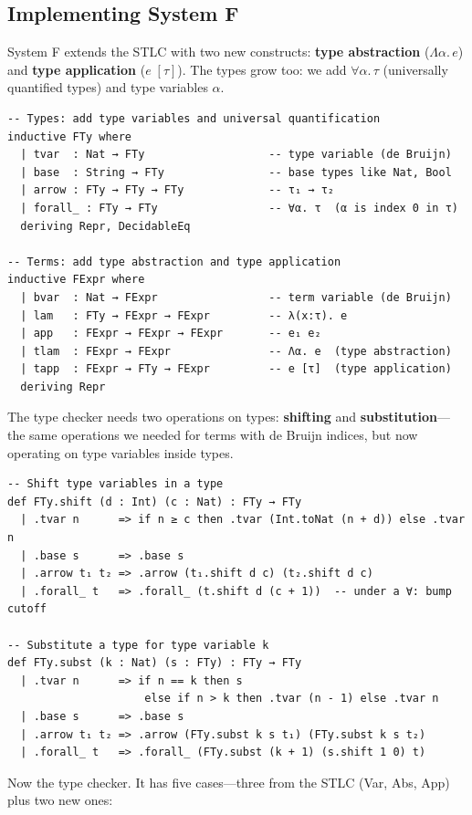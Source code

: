 \documentclass[11pt,a4paper]{article}
\theoremstyle{definition}
\newcommand{\Lam}{\Lambda}
\begin{document}
\subsection{Implementing System F}

System F extends the STLC with two new constructs: \textbf{type abstraction}
($\Lam\alpha.\, e$) and \textbf{type application} ($e\;[\tau]$). The types
grow too: we add $\forall\alpha.\, \tau$ (universally quantified types) and
type variables $\alpha$.

\begin{verbatim}
-- Types: add type variables and universal quantification
inductive FTy where
  | tvar  : Nat → FTy                   -- type variable (de Bruijn)
  | base  : String → FTy                -- base types like Nat, Bool
  | arrow : FTy → FTy → FTy             -- τ₁ → τ₂
  | forall_ : FTy → FTy                 -- ∀α. τ  (α is index 0 in τ)
  deriving Repr, DecidableEq

-- Terms: add type abstraction and type application
inductive FExpr where
  | bvar  : Nat → FExpr                 -- term variable (de Bruijn)
  | lam   : FTy → FExpr → FExpr         -- λ(x:τ). e
  | app   : FExpr → FExpr → FExpr       -- e₁ e₂
  | tlam  : FExpr → FExpr               -- Λα. e  (type abstraction)
  | tapp  : FExpr → FTy → FExpr         -- e [τ]  (type application)
  deriving Repr
\end{verbatim}

The type checker needs two operations on types: \textbf{shifting} and
\textbf{substitution}---the same operations we needed for terms with de Bruijn
indices, but now operating on type variables inside types.

\begin{verbatim}
-- Shift type variables in a type
def FTy.shift (d : Int) (c : Nat) : FTy → FTy
  | .tvar n      => if n ≥ c then .tvar (Int.toNat (n + d)) else .tvar n
  | .base s      => .base s
  | .arrow t₁ t₂ => .arrow (t₁.shift d c) (t₂.shift d c)
  | .forall_ t   => .forall_ (t.shift d (c + 1))  -- under a ∀: bump cutoff

-- Substitute a type for type variable k
def FTy.subst (k : Nat) (s : FTy) : FTy → FTy
  | .tvar n      => if n == k then s
                     else if n > k then .tvar (n - 1) else .tvar n
  | .base s      => .base s
  | .arrow t₁ t₂ => .arrow (FTy.subst k s t₁) (FTy.subst k s t₂)
  | .forall_ t   => .forall_ (FTy.subst (k + 1) (s.shift 1 0) t)
\end{verbatim}

Now the type checker. It has five cases---three from the STLC (Var, Abs, App)
plus two new ones:
\end{document}
